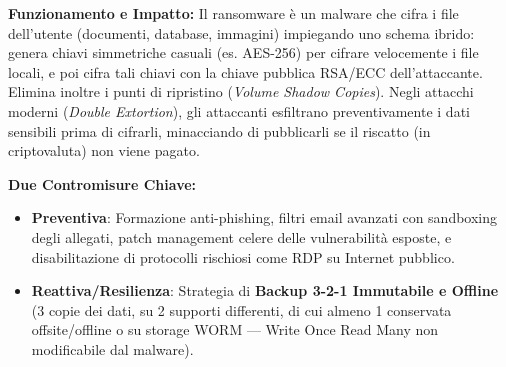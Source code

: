 \documentclass[11pt,a4paper]{article}
\begin{document}
\begin{solutionbox}
\textbf{Funzionamento e Impatto:}
Il ransomware \`e un malware che cifra i file dell'utente (documenti, database, immagini) impiegando uno schema ibrido: genera chiavi simmetriche casuali (es. AES-256) per cifrare velocemente i file locali, e poi cifra tali chiavi con la chiave pubblica RSA/ECC dell'attaccante. Elimina inoltre i punti di ripristino (\textit{Volume Shadow Copies}). Negli attacchi moderni (\textit{Double Extortion}), gli attaccanti esfiltrano preventivamente i dati sensibili prima di cifrarli, minacciando di pubblicarli se il riscatto (in criptovaluta) non viene pagato.

\textbf{Due Contromisure Chiave:}
\begin{itemize}
    \item \textbf{Preventiva}: Formazione anti-phishing, filtri email avanzati con sandboxing degli allegati, patch management celere delle vulnerabilit\`a esposte, e disabilitazione di protocolli rischiosi come RDP su Internet pubblico.
    \item \textbf{Reattiva/Resilienza}: Strategia di \textbf{Backup 3-2-1 Immutabile e Offline} (3 copie dei dati, su 2 supporti differenti, di cui almeno 1 conservata offsite/offline o su storage WORM --- Write Once Read Many non modificabile dal malware).
\end{itemize}
\end{solutionbox}
\end{document}
